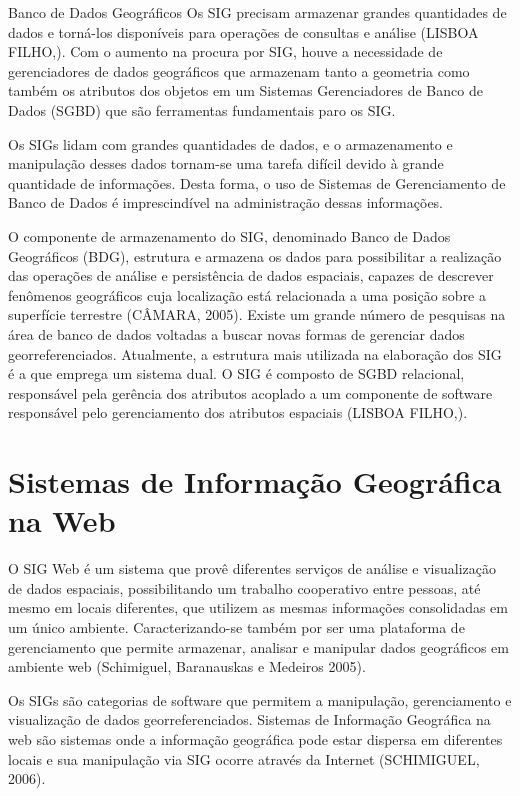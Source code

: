 \documentclass[
	12pt,				%
    oneside,			%
	a4paper,			%
	english,			%
	french,				%
	spanish,			%
	brazil,				%
	]{abntex2}
\begin{document}
Banco de Dados Geográficos
Os SIG precisam armazenar grandes quantidades de dados e torná-los disponíveis para operações de consultas e análise (LISBOA FILHO,). Com o aumento na procura por SIG, houve a necessidade de gerenciadores de dados geográficos que armazenam tanto a geometria como também os atributos dos objetos em um Sistemas Gerenciadores de Banco de Dados (SGBD) que são ferramentas fundamentais paro os SIG.

Os SIGs lidam com grandes quantidades de dados, e o armazenamento e manipulação desses dados tornam-se uma tarefa difícil devido à grande quantidade de informações. Desta forma, o uso de Sistemas de Gerenciamento de Banco de Dados é imprescindível na administração dessas informações.

O componente de armazenamento do SIG, denominado Banco de Dados Geográficos (BDG), estrutura e armazena os dados para possibilitar a realização das operações de análise e persistência de dados espaciais, capazes de descrever fenômenos geográficos cuja localização está relacionada a uma posição sobre a superfície terrestre (CÂMARA, 2005).
Existe um grande número de pesquisas na área de banco de dados voltadas a buscar novas formas de gerenciar dados georreferenciados. Atualmente, a estrutura mais utilizada na elaboração dos SIG é a que emprega um sistema dual. O SIG é composto de SGBD relacional, responsável pela gerência dos atributos acoplado a um componente de software responsável pelo gerenciamento dos atributos espaciais (LISBOA FILHO,).


\section{Sistemas de Informação Geográfica na Web}

O SIG Web é um sistema que provê diferentes serviços de análise e visualização de dados espaciais, possibilitando um trabalho cooperativo entre pessoas, até mesmo em locais diferentes, que utilizem as mesmas informações consolidadas em um único ambiente. Caracterizando-se também por ser uma plataforma de gerenciamento que permite armazenar, analisar e manipular dados geográficos em ambiente web (Schimiguel, Baranauskas e Medeiros 2005).

Os SIGs são categorias de software que permitem a manipulação, gerenciamento e visualização de dados georreferenciados. Sistemas de Informação Geográfica na web são sistemas onde a informação geográfica pode estar dispersa em diferentes locais e sua manipulação via SIG ocorre através da Internet (SCHIMIGUEL, 2006).
\end{document}
